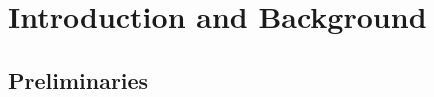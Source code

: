
\chapter{Introduction and Background} %

\label{Chapter1} %


\newcommand{\keyword}[1]{\textbf{#1}}
\newcommand{\tabhead}[1]{\textbf{#1}}
\newcommand{\code}[1]{\texttt{#1}}
\newcommand{\file}[1]{\texttt{\bfseries#1}}
\newcommand{\option}[1]{\texttt{\itshape#1}}



\section{Preliminaries}
\label{preliminaries}


